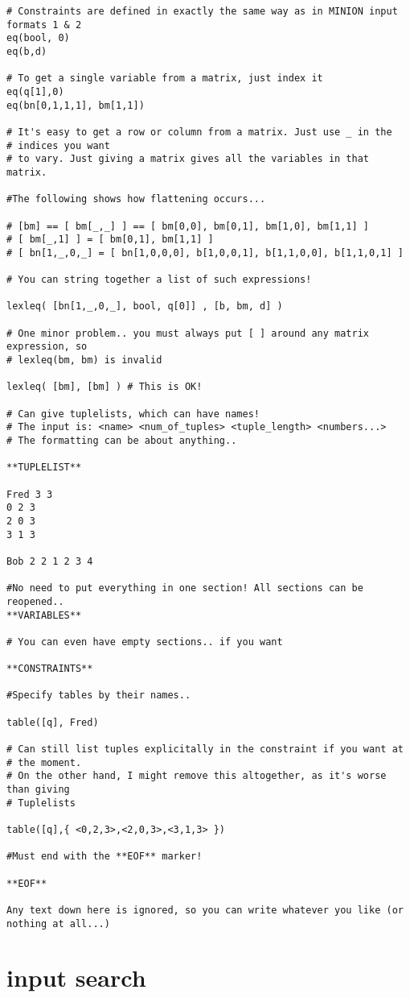 {\begin{verbatim}
# Constraints are defined in exactly the same way as in MINION input
formats 1 & 2
eq(bool, 0)
eq(b,d)

# To get a single variable from a matrix, just index it
eq(q[1],0)
eq(bn[0,1,1,1], bm[1,1])

# It's easy to get a row or column from a matrix. Just use _ in the
# indices you want
# to vary. Just giving a matrix gives all the variables in that matrix.

#The following shows how flattening occurs...

# [bm] == [ bm[_,_] ] == [ bm[0,0], bm[0,1], bm[1,0], bm[1,1] ]
# [ bm[_,1] ] = [ bm[0,1], bm[1,1] ]
# [ bn[1,_,0,_] = [ bn[1,0,0,0], b[1,0,0,1], b[1,1,0,0], b[1,1,0,1] ]

# You can string together a list of such expressions!

lexleq( [bn[1,_,0,_], bool, q[0]] , [b, bm, d] )

# One minor problem.. you must always put [ ] around any matrix expression, so
# lexleq(bm, bm) is invalid

lexleq( [bm], [bm] ) # This is OK!

# Can give tuplelists, which can have names!
# The input is: <name> <num_of_tuples> <tuple_length> <numbers...>
# The formatting can be about anything..

**TUPLELIST**

Fred 3 3
0 2 3
2 0 3
3 1 3

Bob 2 2 1 2 3 4

#No need to put everything in one section! All sections can be reopened..
**VARIABLES**

# You can even have empty sections.. if you want

**CONSTRAINTS**

#Specify tables by their names..

table([q], Fred)

# Can still list tuples explicitally in the constraint if you want at
# the moment.
# On the other hand, I might remove this altogether, as it's worse than giving
# Tuplelists

table([q],{ <0,2,3>,<2,0,3>,<3,1,3> })

#Must end with the **EOF** marker!

**EOF**

Any text down here is ignored, so you can write whatever you like (or
nothing at all...)
\end{verbatim}
}
\section{input search}
